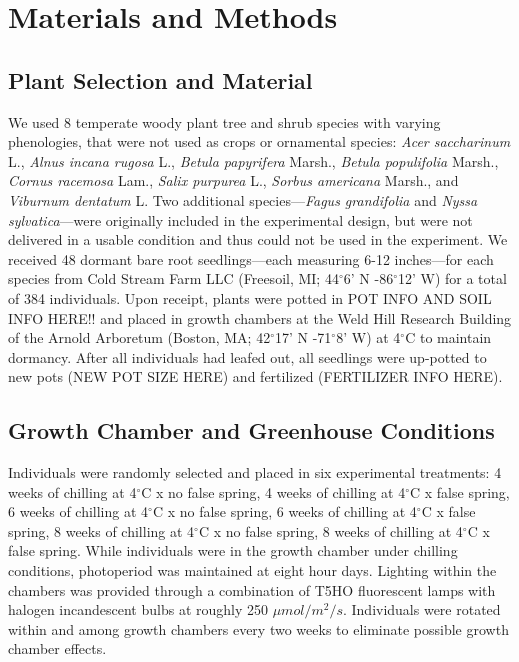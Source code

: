 \documentclass{article}\usepackage[]{graphicx}\usepackage[]{color}
\begin{document}
\section*{Materials and Methods}
\subsection*{Plant Selection and Material}
We used 8 temperate woody plant tree and shrub species with varying phenologies, that were not used as crops or ornamental species: \textit{Acer saccharinum} L., \textit{Alnus incana rugosa} L., \textit{Betula papyrifera} Marsh., \textit{Betula populifolia} Marsh., \textit{Cornus racemosa} Lam., \textit{Salix purpurea} L., \textit{Sorbus americana} Marsh., and \textit{Viburnum dentatum} L. Two additional species---\textit{Fagus grandifolia} and \textit{Nyssa sylvatica}---were originally included in the experimental design, but were not delivered in a usable condition and thus could not be used in the experiment. We received 48 dormant bare root seedlings---each measuring 6-12 inches---for each species from Cold Stream Farm LLC (Freesoil, MI; 44$^{\circ}$6' N -86$^{\circ}$12' W) for a total of 384 individuals. Upon receipt, plants were potted in POT INFO AND SOIL INFO HERE!! and placed in growth chambers at the Weld Hill Research Building of the Arnold Arboretum (Boston, MA; 42$^{\circ}$17' N -71$^{\circ}$8' W) at 4$^{\circ}$C to maintain dormancy. After all individuals had leafed out, all seedlings were up-potted to new pots (NEW POT SIZE HERE) and fertilized (FERTILIZER INFO HERE).

\subsection*{Growth Chamber and Greenhouse Conditions}
Individuals were randomly selected and placed in six experimental treatments: 4 weeks of chilling at 4$^{\circ}$C x no false spring, 4 weeks of chilling at 4$^{\circ}$C x false spring, 6 weeks of chilling at 4$^{\circ}$C x no false spring, 6 weeks of chilling at 4$^{\circ}$C x false spring,
8 weeks of chilling at 4$^{\circ}$C x no false spring, 8 weeks of chilling at 4$^{\circ}$C x false spring. While individuals were in the growth chamber under chilling conditions, photoperiod was maintained at eight hour days. Lighting within the chambers was provided through a combination of T5HO fluorescent lamps with halogen incandescent bulbs at roughly 250 $\mu mol/m^{2}/s$. Individuals were rotated within and among growth chambers every two weeks to eliminate possible growth chamber effects.
\end{document}
